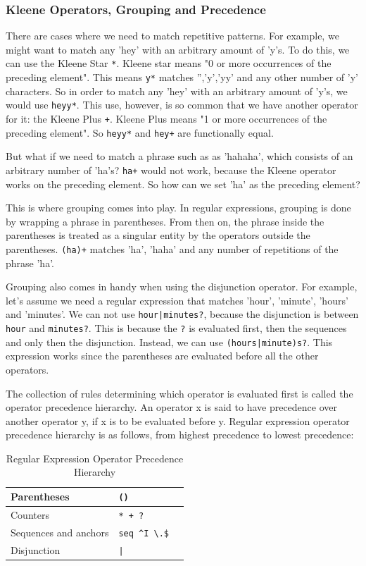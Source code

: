 \subsubsection{Kleene Operators, Grouping and Precedence}

There are cases where we need to match repetitive patterns.
For example, we might want to match any 'hey' with an arbitrary amount of 'y's.
To do this, we can use the Kleene Star \texttt{*}.
Kleene star means "0 or more occurrences of the preceding element".
This means \texttt{y*} matches '','y','yy' and any other number of 'y' characters.
So in order to match any 'hey' with an arbitrary amount of 'y's, we would use \texttt{heyy*}.
This use, however, is so common that we have another operator for it: the Kleene Plus \texttt{+}.
Kleene Plus means "1 or more occurrences of the preceding element".
So \texttt{heyy*} and \texttt{hey+} are functionally equal.

But what if we need to match a phrase such as as 'hahaha', which consists of an arbitrary number of 'ha's?
\texttt{ha+} would not work, because the Kleene operator works on the preceding element.
So how can we set 'ha' as the preceding element?

This is where grouping comes into play.
In regular expressions, grouping is done by wrapping a phrase in parentheses. 
From then on, the phrase inside the parentheses is treated as a singular entity by the operators outside the parentheses.
\texttt{(ha)+} matches 'ha', 'haha' and any number of repetitions of the phrase 'ha'.

Grouping also comes in handy when using the disjunction operator.
For example, let's assume we need a regular expression that matches 'hour', 'minute', 'hours' and 'minutes'.
We can not use \texttt{hour|minutes?}, because the disjunction is between \texttt{hour} and \texttt{minutes?}.
This is because the \texttt{?} is evaluated first, then the sequences and only then the disjunction. 
Instead, we can use \texttt{(hours|minute)s?}. 
This expression works since the parentheses are evaluated before all the other operators.

The collection of rules determining which operator is evaluated first is called the operator precedence hierarchy.
An operator x is said to have precedence over another operator y, if x is to be evaluated before y.
Regular expression operator precedence hierarchy is as follows, from highest precedence to lowest precedence:

\begin{table}[htbp]
  \caption[Regular Expression Operator Precedence Hierarchy]{Regular Expression Operator Precedence Hierarchy}\label{tab:re_oph}
  \centering
  \begin{tabular}{l l l}
    Parentheses&\texttt{()}&\\ \hline 
    Counters&\texttt{* + ?}&\\ \hline 
    Sequences and anchors&\texttt{seq \^{}I \textbackslash.\$}&\\ \hline 
    Disjunction&\texttt{|}&\\ \hline 
  \end{tabular}
\end{table}


